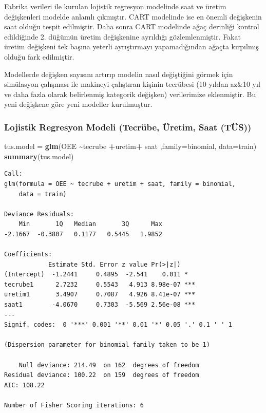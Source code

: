 \documentclass[12pt,twoside]{deuthesis}
\newenvironment{Shaded}{\begin{snugshade}}{\end{snugshade}}
\newcommand{\DataTypeTok}[1]{\textcolor[rgb]{0.13,0.29,0.53}{#1}}
\newcommand{\KeywordTok}[1]{\textcolor[rgb]{0.13,0.29,0.53}{\textbf{#1}}}
\newcommand{\NormalTok}[1]{#1}
\newcommand{\OperatorTok}[1]{\textcolor[rgb]{0.81,0.36,0.00}{\textbf{#1}}}
\newcommand{\StringTok}[1]{\textcolor[rgb]{0.31,0.60,0.02}{#1}}
\begin{document}
Fabrika verileri ile kurulan lojistik regresyon modelinde saat ve üretim değişkenleri modelde anlamlı çıkmıştır. CART modelinde ise en önemli değişkenin saat olduğu tespit edilmiştir. Daha sonra CART modelinde ağaç derinliği kontrol edildiğinde 2. düğümün üretim değişkenine ayrıldığı gözlemlenmiştir. Fakat üretim değişkeni tek başına yeterli ayrıştırmayı yapamadığından ağaçta kırpılmış olduğu fark edilmiştir.

Modellerde değişken sayısını artırıp modelin nasıl değiştiğini görmek için simülasyon çalışması ile makineyi çalıştıran kişinin tecrübesi (10 yıldan az\&10 yıl ve daha fazla olarak belirlenmiş kategorik değişken) verilerimize eklenmiştir.
Bu yeni değişkene göre yeni modeller kurulmuştur.

\hypertarget{lojistik-regresyon-modeli-tecruxfcbe-uxfcretim-saat-tuxfcs}{%
\subsubsection{Lojistik Regresyon Modeli (Tecrübe, Üretim, Saat (TÜS))}\label{lojistik-regresyon-modeli-tecruxfcbe-uxfcretim-saat-tuxfcs}}
\begin{Shaded}
\begin{Highlighting}[]
\NormalTok{tus.model =}\StringTok{ }\KeywordTok{glm}\NormalTok{(OEE }\OperatorTok{\textasciitilde{}}\NormalTok{tecrube }\OperatorTok{+}\NormalTok{uretim}\OperatorTok{+}\StringTok{ }\NormalTok{saat ,}\DataTypeTok{family=}\NormalTok{binomial, }\DataTypeTok{data=}\NormalTok{train)}
\KeywordTok{summary}\NormalTok{(tus.model)}
\end{Highlighting}
\end{Shaded}
\begin{verbatim}
Call:
glm(formula = OEE ~ tecrube + uretim + saat, family = binomial, 
    data = train)

Deviance Residuals: 
    Min       1Q   Median       3Q      Max  
-2.1667  -0.3807   0.1177   0.5445   1.9852  

Coefficients:
            Estimate Std. Error z value Pr(>|z|)    
(Intercept)  -1.2441     0.4895  -2.541    0.011 *  
tecrube1      2.7232     0.5543   4.913 8.98e-07 ***
uretim1       3.4907     0.7087   4.926 8.41e-07 ***
saat1        -4.0670     0.7303  -5.569 2.56e-08 ***
---
Signif. codes:  0 '***' 0.001 '**' 0.01 '*' 0.05 '.' 0.1 ' ' 1

(Dispersion parameter for binomial family taken to be 1)

    Null deviance: 214.49  on 162  degrees of freedom
Residual deviance: 100.22  on 159  degrees of freedom
AIC: 108.22

Number of Fisher Scoring iterations: 6
\end{verbatim}
\end{document}
